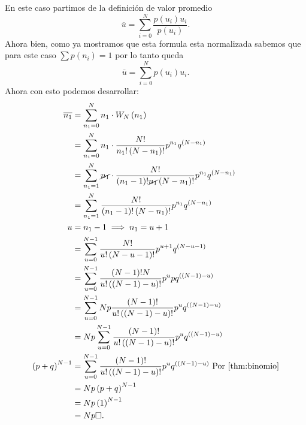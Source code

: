 \documentclass{report}
\begin{document}
En este caso partimos de la definición de valor promedio \[
\overline{u} = \sum_{i=0}^{N} \frac{p\left( u_i \right) u_i}{p\left( u_i \right) }
.\]  Ahora bien, como ya mostramos que esta formula esta normalizada sabemos que para este caso $\sum p(n_i) = 1$ por lo tanto queda \[
\overline{u} = \sum_{i=0}^{N} p\left( u_i \right) u_i
.\] Ahora con esto podemos desarrollar:
\begin{align*}
  \overline{n_1} &= \sum_{n_1=0}^{N} n_1 \cdot  W_N\left( n_1 \right) \\
  &= \sum_{n_1 = 0}^{N} n_1 \cdot  \frac{N!}{n_1!\left( N - n_{1} \right)!}p^{n_1}q^{\left( N - n_1 \right) } \\
  &= \sum_{n_1 = 1}^{N} \cancel{n_1} \cdot \frac{N!}{\left( n_1 - 1 \right)! \cancel{n_1} \left( N - n_1 \right)!}p^{n_1}q^{\left( N - n_1 \right) } \\
  &= \sum_{n_1 = 1}^{N} \frac{N!}{\left( n_1 - 1 \right)! \left( N - n_1 \right)!}p^{n_1}q^{\left( N - n_1 \right) } \\
  u &= n_1 - 1 \implies n_1 = u + 1 \\
  &= \sum_{u = 0}^{N - 1} \frac{N!}{u! \left( N - u - 1 \right)! } p^{u + 1} q^{\left( N - u - 1 \right) }\\
  &= \sum_{u = 0}^{N - 1} \frac{\left( N - 1 \right) ! N}{u! \left( \left( N - 1 \right) - u \right)!}p^{u}pq^{\left( \left( N - 1 \right) - u \right) } \\
  &= \sum_{u = 0}^{N - 1} Np \frac{\left( N - 1 \right)!}{u! \left( \left( N - 1 \right) - u \right)! }p^{u}q^{\left( \left( N - 1 \right) - u \right) } \\
  &= Np \sum_{u = 0}^{N - 1} \frac{\left( N - 1 \right)!}{u! \left( \left( N - 1 \right) - u \right)! }p^{u}q^{\left( \left( N - 1 \right) - u \right) } \\
  \left( p + q \right)^{N - 1} &= \sum_{u = 0}^{N - 1} \frac{\left( N - 1 \right)!}{u! \left( \left( N - 1 \right) - u \right)! }p^{u}q^{\left( \left( N - 1 \right) - u \right) } \text{ Por \ref{thm:binomio}} \\
  &= Np \left( p + q \right)^{N - 1} \\
  &= Np \left( 1 \right)^{N - 1} \\
  &= Np \square
.\end{align*}

\section{}
\end{document}

